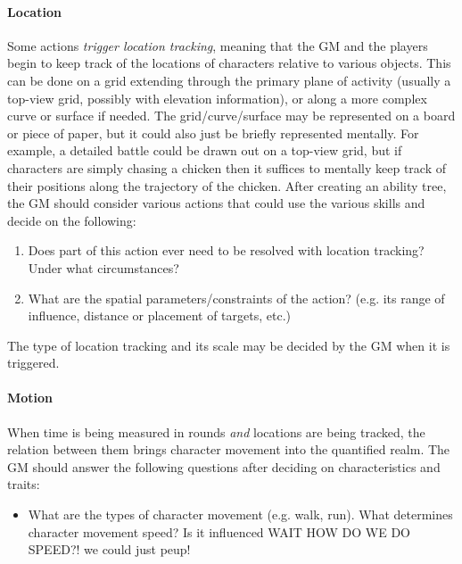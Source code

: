 \documentclass[12pt]{article}
\newcommand{\notes}[1]{{\color{Tan} #1}}
\begin{document}
\paragraph{Location}
Some actions \emph{trigger location tracking},
meaning that the GM and the players begin to keep track of the locations of characters relative to various objects.
This can be done on a grid extending through the primary plane of activity
(usually a top-view grid, possibly with elevation information),
or along a more complex curve or surface if needed.
The grid/curve/surface may be represented on a board or piece of paper, but it could also just be briefly represented mentally.
For example, a detailed battle could be drawn out on a top-view grid,
but if characters are simply chasing a chicken then it suffices to mentally keep track
of their positions along the trajectory of the chicken.
After creating an ability tree, the GM should consider various actions
that could use the various skills and decide on the following:
\vspace{-1em}
\begin{enumerate}
\item\label{itm:grid:trigger}
Does part of this action ever need to be resolved with location tracking? Under what circumstances?
\item\label{itm:grid:length}
What are the spatial parameters/constraints of the action? (e.g. its range of influence, distance or placement of targets, etc.)
\end{enumerate}
The type of location tracking and its scale may be decided by the GM when it is triggered.



\paragraph{Motion}
When time is being measured in rounds \emph{and} locations are being tracked,
the relation between them brings character movement into the quantified realm.
The GM should answer the following questions after deciding on characteristics and traits:
\vspace{-1em}
\begin{itemize}
\item
What are the types of character movement (e.g. walk, run).
What determines character movement speed?
Is it influenced \notes{WAIT HOW DO WE DO SPEED?! we could just peup!}
\end{itemize}
\end{document}
